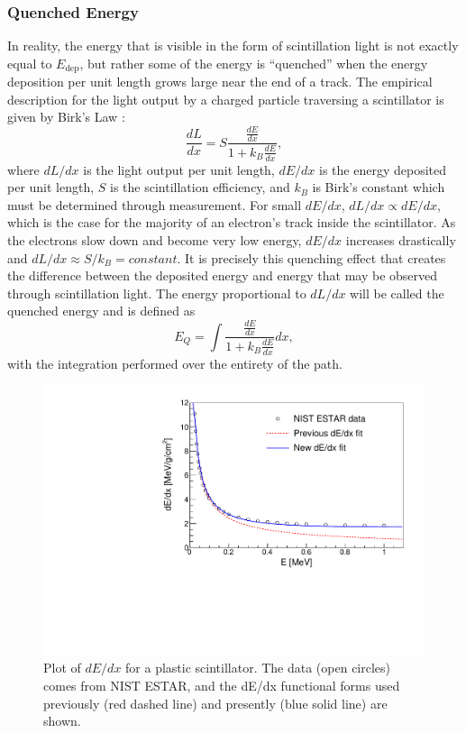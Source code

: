 \subsubsection{Quenched Energy} \label{sssec:Equenched}
In reality, the energy that is visible in the form of scintillation light is not exactly
equal to $E_{\mathrm{dep}}$, but rather some of the energy is ``quenched'' when
the energy deposition per unit length grows large near the end of a track. The
empirical description for the light output by a charged particle traversing a
scintillator is given by Birk's Law \cite{birks1951scintillations}:
%
\begin{equation}
  \frac{dL}{dx} = S\frac{\frac{dE}{dx}}{1+k_B\frac{dE}{dx}},
\end{equation}
%
where $dL/dx$ is the light output per unit length, $dE/dx$ is the energy deposited per unit
length, $S$ is the scintillation efficiency, and $k_B$ is Birk's constant which must be
determined through measurement. For small $dE/dx$,
$dL/dx \propto dE/dx$, which is the case for the majority of an electron's track inside the scintillator.
As the electrons slow down and become very low energy, $dE/dx$ increases drastically
and $dL/dx \approx S/k_B = constant$. It is precisely this quenching effect that creates the difference
between the deposited energy and energy that may be observed through scintillation light. The energy
proportional to $dL/dx$ will be called the quenched energy and is defined as
%
\begin{equation}
  E_Q = \int \frac{\frac{dE}{dx}}{1+k_B\frac{dE}{dx}}dx,
\end{equation}
%
with the integration performed over the entirety of the path.

\begin{figure}[h] 
\centering
\includegraphics[scale=.6]{3-UCNAAnalysis/dEdx.pdf}
\caption{Plot of $dE/dx$ for a plastic scintillator. The data (open circles) comes from NIST ESTAR,
  and the dE/dx functional forms used previously (red dashed line) and presently (blue solid line)
  are shown.}
\label{fig:dEdx}
\end{figure}

